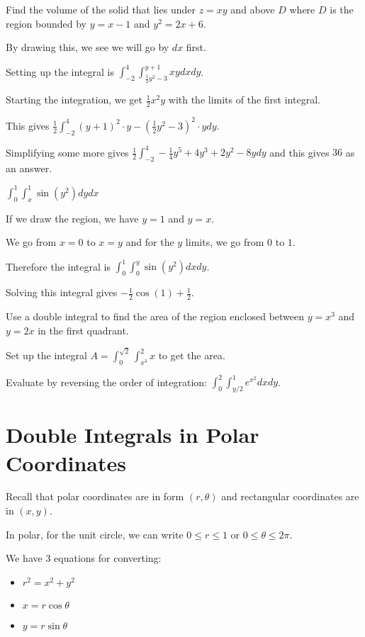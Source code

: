 \documentclass[../calc3.tex]{subfiles}
\begin{document}
\begin{example}
    Find the volume of the solid that lies under $z=xy$ and above $D$ where $D$ is the region bounded by $y=x-1$ and $y^2=2x+6$.

    By drawing this, we see we will go by $dx$ first.

    Setting up the integral is $\int_{-2}^4 \int_{\frac{1}{2}y^2-3}^{y+1}xydx dy$.

    Starting the integration, we get $\frac{1}{2}x^2y$ with the limits of the first integral.

    This gives $\frac{1}{2}\int_{-2}^4 (y+1)^2\cdot y-\left(\frac{1}{2}y^2-3\right)^2\cdot y dy$.

    Simplifying some more gives $\frac{1}{2}\int_{-2}^4 -\frac{1}{4}y^5+4y^3+2y^2-8y dy$ and this gives $36$ as an answer.
\end{example}

\begin{example}
    $\int_0^1 \int_x^1 \sin(y^2)dy dx$

    If we draw the region, we have $y=1$ and $y=x$.

    We go from $x=0$ to $x=y$ and for the $y$ limits, we go from $0$ to $1$.

    Therefore the integral is $\int_0^1 \int_0^y \sin(y^2)dxdy$.

    Solving this integral gives $-\frac{1}{2}\cos(1)+\frac{1}{2}$.
\end{example}

\begin{example}
    Use a double integral to find the area of the region enclosed between $y=x^3$ and $y=2x$ in the first quadrant.

    Set up the integral $A=\int_0^{\sqrt{2}}\int_{x^3}^2x$ to get the area.
\end{example}

\ex Evaluate by reversing the order of integration: $\int_0^2 \int_{y/2}^1 e^{x^2}dxdy$.

\section{Double Integrals in Polar Coordinates}
Recall that polar coordinates are in form $(r,\theta)$ and rectangular coordinates are in $(x,y)$.

In polar, for the unit circle, we can write $0\leq r\leq 1$ or $0\leq \theta \leq 2\pi$.

We have $3$ equations for converting: 
\begin{itemize}
    \item $r^2=x^2+y^2$
    \item $x=r\cos\theta$
    \item $y=r\sin\theta$
\end{itemize}
\end{document}
